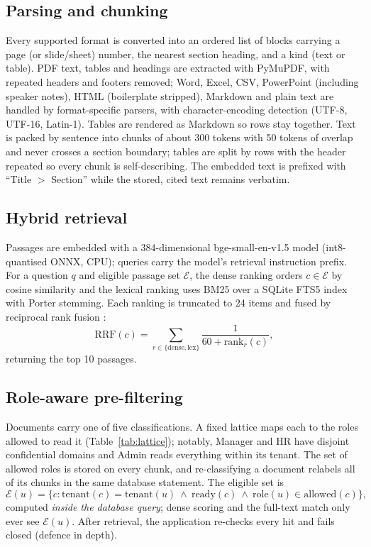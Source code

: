 \documentclass[journal]{IEEEtran}
\begin{document}
\subsection{Parsing and chunking}
Every supported format is converted into an ordered list of blocks carrying a page (or slide/sheet) number, the nearest section heading, and a kind (text or table). PDF text, tables and headings are extracted with PyMuPDF, with repeated headers and footers removed; Word, Excel, CSV, PowerPoint (including speaker notes), HTML (boilerplate stripped), Markdown and plain text are handled by format-specific parsers, with character-encoding detection (UTF-8, UTF-16, Latin-1). Tables are rendered as Markdown so rows stay together. Text is packed by sentence into chunks of about 300 tokens with 50 tokens of overlap and never crosses a section boundary; tables are split by rows with the header repeated so every chunk is self-describing. The embedded text is prefixed with ``Title $>$ Section'' while the stored, cited text remains verbatim.

\subsection{Hybrid retrieval}
Passages are embedded with a 384-dimensional bge-small-en-v1.5 model \cite{xiao2023cpack} (int8-quantised ONNX, CPU); queries carry the model's retrieval instruction prefix. For a question $q$ and eligible passage set $\mathcal{E}$, the dense ranking orders $c\in\mathcal{E}$ by cosine similarity and the lexical ranking uses BM25 over a SQLite FTS5 index with Porter stemming. Each ranking is truncated to 24 items and fused by reciprocal rank fusion \cite{cormack2009rrf}:
\begin{equation}
\mathrm{RRF}(c)=\sum_{r\in\{\text{dense},\text{lex}\}}\frac{1}{60+\mathrm{rank}_r(c)},
\end{equation}
returning the top 10 passages.

\subsection{Role-aware pre-filtering}
Documents carry one of five classifications. A fixed lattice maps each to the roles allowed to read it (Table~\ref{tab:lattice}); notably, Manager and HR have disjoint confidential domains and Admin reads everything within its tenant. The set of allowed roles is stored on every chunk, and re-classifying a document relabels all of its chunks in the same database statement. The eligible set is
\begin{equation}
\mathcal{E}(u)=\{c : \mathrm{tenant}(c)=\mathrm{tenant}(u)\ \wedge\ \mathrm{ready}(c)\ \wedge\ \mathrm{role}(u)\in\mathrm{allowed}(c)\},
\end{equation}
computed \emph{inside the database query}; dense scoring and the full-text match only ever see $\mathcal{E}(u)$. After retrieval, the application re-checks every hit and fails closed (defence in depth).
\end{document}
